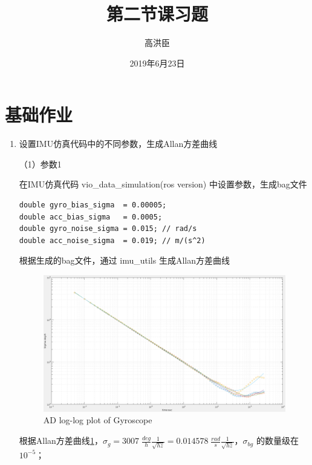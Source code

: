 \documentclass[12pt,a4paper]{article}
\title{第二节课习题}
\author{高洪臣}
\date{2019年6月23日}
\begin{document}
\maketitle

\section*{基础作业}

\begin{enumerate}

\item 设置IMU仿真代码中的不同参数，生成Allan方差\cite{variance2015noise}曲线

（1）参数1

在IMU仿真代码 vio\_data\_simulation(ros version) 中设置参数，生成bag文件

\begin{lstlisting}[frame=shadowbox]
double gyro_bias_sigma  = 0.00005;
double acc_bias_sigma   = 0.0005;
double gyro_noise_sigma = 0.015; // rad/s
double acc_noise_sigma  = 0.019; // m/(s^2)
\end{lstlisting}

根据生成的bag文件，通过 imu\_utils 生成Allan方差曲线

\begin{figure}[htbp] 
\centering
\includegraphics[width=15cm]{imu_sim_01_gyr.png} 
\caption{AD log-log plot of Gyroscope}
\label{fig:ad11} 
\end{figure} 

根据Allan方差曲线\ref{fig:ad11}，$
\sigma_g = 3007     \; \frac{deg}{h} \frac{1}{\sqrt{hz}} 
         = 0.014578 \; \frac{rad}{s} \frac{1}{\sqrt{hz}}
$，$\sigma_{bg}$ 的数量级在 $10^{-5}$；


\end{enumerate}
\end{document}
